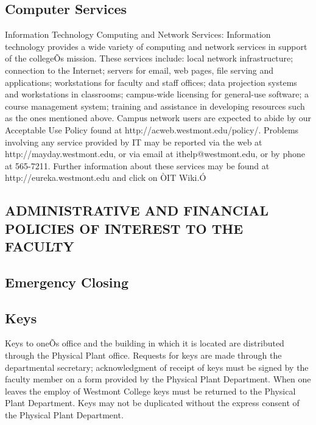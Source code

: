 \documentclass[letterpaper, 11pt]{article}
\begin{document}
	\subsection{Computer Services}
		Information Technology Computing and Network Services:  Information technology provides a wide variety of computing and network services in support of the collegeÕs mission.  These services include:  local network infrastructure; connection to the Internet; servers for email, web pages, file serving and applications; workstations for faculty and staff offices; data projection systems and workstations in classrooms; campus-wide licensing for general-use software; a course management system; training and assistance in developing resources such as the ones mentioned above.
		Campus network users are expected to abide by our Acceptable Use Policy found at http://acweb.westmont.edu/policy/.  Problems involving any service provided by IT may be reported via the web at http://mayday.westmont.edu, or via email at ithelp@westmont.edu, or by phone at 565-7211.  Further information about these services may be found at http://eureka.westmont.edu and click on ÒIT Wiki.Ó

	\subsection{ADMINISTRATIVE AND FINANCIAL POLICIES OF INTEREST TO THE FACULTY}
	\subsection{Emergency Closing}
	\subsection{Keys}
		Keys to oneÕs office and the building in which it is located are distributed through the Physical Plant office.  Requests for keys are made through the departmental secretary; acknowledgment of receipt of keys must be signed by the faculty member on a form provided by the Physical Plant Department.  When one leaves the employ of Westmont College keys must be returned to the Physical Plant Department.  Keys may not be duplicated without the express consent of the Physical Plant Department.
\end{document}
